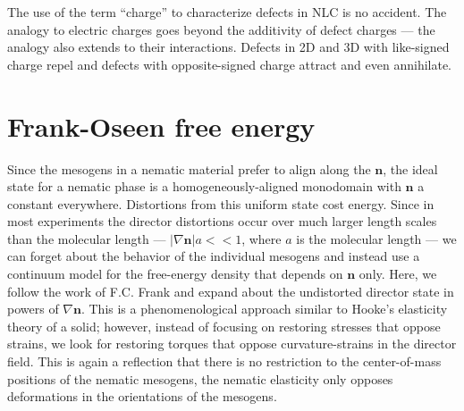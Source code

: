The use of the term ``charge'' to characterize defects in NLC is no accident.
The analogy to electric charges goes beyond the additivity of defect charges --- the analogy also extends to their interactions.
Defects in 2D and 3D with like-signed charge repel and defects with opposite-signed charge attract and even annihilate.




\section{Frank-Oseen free energy}
Since the mesogens in a nematic material prefer to align along the $\mathbf{n}$, the ideal state for a nematic phase is a homogeneously-aligned monodomain with $\mathbf{n}$ a constant everywhere.
Distortions from this uniform state cost energy.
Since in most experiments the director distortions occur over much larger length scales than the molecular length --- $|\nabla \mathbf{n}| a << 1$, where $a$ is the molecular length --- we can forget about the behavior of the individual mesogens and instead use a continuum model for the free-energy density that depends on $\mathbf{n}$ only.
Here, we follow the work of F.C. Frank and expand about the undistorted director state in powers of $\nabla \mathbf{n}$.
This is a phenomenological approach similar to Hooke's elasticity theory of a solid; however, instead of focusing on restoring stresses that oppose strains, we look for restoring torques that oppose curvature-strains in the director field.
This is again a reflection that there is no restriction to the center-of-mass positions of the nematic mesogens, the nematic elasticity only opposes deformations in the orientations of the mesogens.

